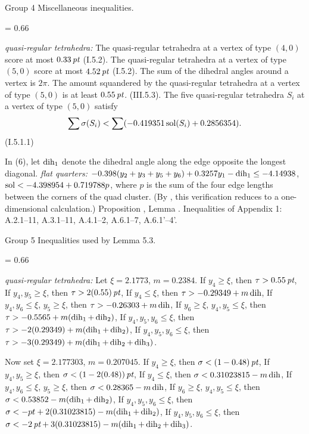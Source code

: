 \bigskip
\subhead Group 4\endsubhead
  Miscellaneous inequalities.
{
\baselineskip = 0.66\baselineskip
\obeylines
\parskip=0pt
 
\hbox{}
{\it quasi-regular tetrahedra: }
  The quasi-regular tetrahedra at a vertex of type $(4,0)$
	score at most $0.33\,\hbox{\it pt}$ (I.5.2).
  The quasi-regular tetrahedra at a vertex of type $(5,0)$
	score at most $4.52\,\hbox{\it pt}$ (I.5.2).
  The sum of the dihedral angles around a vertex is $2\pi$.
  The amount squandered by the quasi-regular tetrahedra at a 
	vertex of type $(5,0)$ is at least $0.55\,\hbox{\it pt}$. (III.5.3).
  The five quasi-regular tetrahedra $S_i$ at a vertex of type $(5,0)$
	satisfy $$\sum\sigma(S_i)  <  \sum (-0.419351\operatorname{sol}(S_i) + 0.2856354).$$
	(I.5.1.1)

\smallskip
In (6), let $\operatorname{dih}_1$ denote the dihedral angle along the edge opposite the
longest diagonal.
{\it flat quarters: }
 $-0.398(y_2+y_3+y_5+y_6) + 0.3257y_1 - \operatorname{dih}_1 \le -4.14938$,
 $\operatorname{sol} < -4.398954 + 0.719788 p$, where $p$ is the sum of the
	four edge lengths between the corners of the quad cluster.
	(By \cite{H1,6.1}, this verification reduces to a one-dimensional
	calculation.)
 Proposition , Lemma .
 Inequalities of Appendix 1: A.2.1--11, A.3.1--11, A.4.1--2, A.6.1--7,
	A.6.1'--4'.

}

\bigskip
\subhead Group 5\endsubhead
  Inequalities used by Lemma 5.3.
{
\baselineskip = 0.66\baselineskip
\obeylines
\parskip=0pt
 
\hbox{}
{\it quasi-regular tetrahedra: } Let $\xi=2.1773$, $m=0.2384$.
  If $y_4\ge \xi$, then $\tau > 0.55\,\hbox{\it pt}$,
  If $y_4,y_5\ge\xi$, then $\tau > 2(0.55)\,\hbox{\it pt}$,
  If $y_4\le \xi$, then $\tau > -0.29349 + m\operatorname{dih}$,
  If $y_4,y_6\le\xi$, $y_5\ge\xi$, then $\tau>-0.26303+m\operatorname{dih}$,
  If $y_6\ge\xi$, $y_4,y_5\le\xi$, then $\tau>-0.5565+m(\operatorname{dih}_1+\operatorname{dih}_2)$,
  If $y_4,y_5,y_6\le\xi$, then $\tau>-2(0.29349)+m(\operatorname{dih}_1+\operatorname{dih}_2)$,
  If $y_4,y_5,y_6\le\xi$, then $\tau>-3(0.29349)+m(\operatorname{dih}_1+\operatorname{dih}_2+\operatorname{dih}_3)$.

\smallskip
Now set $\xi=2.177303$, $m =0.207045$.
  If $y_4\ge \xi$, then $\sigma < (1-0.48)\,\hbox{\it pt}$,
  If $y_4,y_5\ge\xi$, then $\sigma < (1-2(0.48))\,\hbox{\it pt}$,
  If $y_4\le \xi$, then $\sigma < 0.31023815 - m\operatorname{dih}$,
  If $y_4,y_6\le\xi$, $y_5\ge\xi$, then $\sigma<0.28365-m\operatorname{dih}$,
  If $y_6\ge\xi$, $y_4,y_5\le\xi$, then $\sigma<0.53852-m(\operatorname{dih}_1+\operatorname{dih}_2)$,
  If $y_4,y_5,y_6\le\xi$, then $\sigma<-pt+2(0.31023815)-m(\operatorname{dih}_1+\operatorname{dih}_2)$,
  If $y_4,y_5,y_6\le\xi$, then $\sigma<-2\,\hbox{\it pt}+3(0.31023815)-m(\operatorname{dih}_1+\operatorname{dih}_2+\operatorname{dih}_3)$.
}




